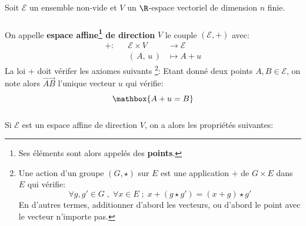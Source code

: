 \chapter*{} %
Soit \(\mathscr{E}\) un ensemble non-vide et \(V\) un \(\R\)-espace vectoriel de dimension \(n\) finie.
\subsection*{}
On appelle \textbf{espace affine\footnote[1]{Ses éléments sont alors appelés des \textbf{points}.} de direction} \(V\) le couple \((\mathscr{E}, +)\) avec:
\[
   \begin{aligned}
      + : &&\mathscr{E} \times V &\longrightarrow \mathscr{E}\\
      &&(\,A, \, u\,) &\longmapsto A + u
   \end{aligned}
\]
La loi + doit vérifer les axiomes suivants 
\footnote[2]{Une action d'un groupe \((G, \star)\) sur \(E\) est une application \(+\) de \(G \times E \) dans \(E\) qui vérifie: \[
   \forall g, g' \in G  \; , \; \forall x \in E \; ; \; x + (g \star g') = (x + g) \star g'
\] \hspace{15pt} En d'autres termes, additionner d'abord les vecteurs, ou d'abord le point avec le vecteur n'importe pas.}:
Etant donné deux points \(A, B \in \mathscr{E}\), on note alors \(\overrightarrow{AB}\) l'unique vecteur \(u\) qui vérifie:
\[
   \mathbox{A + u = B}   
\]

\subsection*{}
Si \(\mathscr{E}\) est un espace affine de direction \(V\), on a alors les propriétés suivantes:

